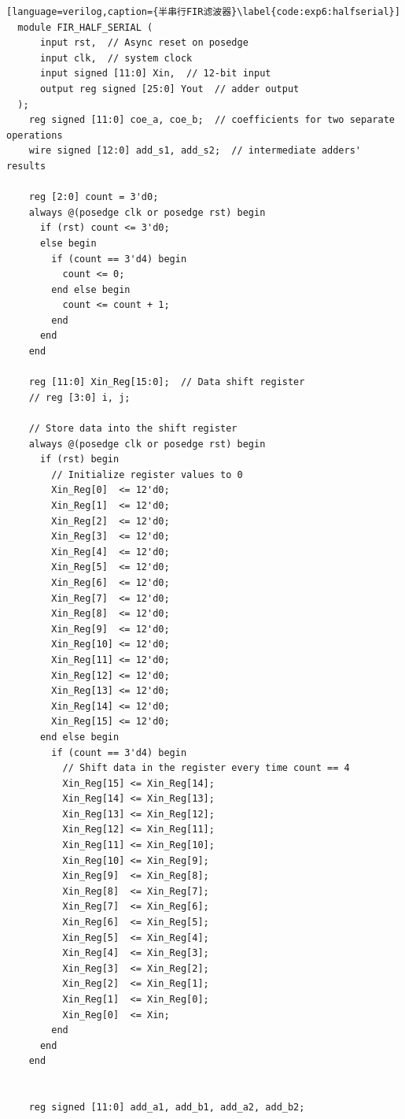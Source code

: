 \begin{lstlisting}[language=verilog,caption={半串行FIR滤波器}\label{code:exp6:halfserial}]
  module FIR_HALF_SERIAL (
      input rst,  // Async reset on posedge            
      input clk,  // system clock                    
      input signed [11:0] Xin,  // 12-bit input
      output reg signed [25:0] Yout  // adder output
  );
    reg signed [11:0] coe_a, coe_b;  // coefficients for two separate operations
    wire signed [12:0] add_s1, add_s2;  // intermediate adders' results
  
    reg [2:0] count = 3'd0;  
    always @(posedge clk or posedge rst) begin
      if (rst) count <= 3'd0;
      else begin
        if (count == 3'd4) begin
          count <= 0;
        end else begin
          count <= count + 1;
        end
      end
    end
  
    reg [11:0] Xin_Reg[15:0];  // Data shift register
    // reg [3:0] i, j; 
  
    // Store data into the shift register
    always @(posedge clk or posedge rst) begin
      if (rst) begin
        // Initialize register values to 0
        Xin_Reg[0]  <= 12'd0;
        Xin_Reg[1]  <= 12'd0;
        Xin_Reg[2]  <= 12'd0;
        Xin_Reg[3]  <= 12'd0;
        Xin_Reg[4]  <= 12'd0;
        Xin_Reg[5]  <= 12'd0;
        Xin_Reg[6]  <= 12'd0;
        Xin_Reg[7]  <= 12'd0;
        Xin_Reg[8]  <= 12'd0;
        Xin_Reg[9]  <= 12'd0;
        Xin_Reg[10] <= 12'd0;
        Xin_Reg[11] <= 12'd0;
        Xin_Reg[12] <= 12'd0;
        Xin_Reg[13] <= 12'd0;
        Xin_Reg[14] <= 12'd0;
        Xin_Reg[15] <= 12'd0;
      end else begin
        if (count == 3'd4) begin
          // Shift data in the register every time count == 4
          Xin_Reg[15] <= Xin_Reg[14];
          Xin_Reg[14] <= Xin_Reg[13];
          Xin_Reg[13] <= Xin_Reg[12];
          Xin_Reg[12] <= Xin_Reg[11];
          Xin_Reg[11] <= Xin_Reg[10];
          Xin_Reg[10] <= Xin_Reg[9];
          Xin_Reg[9]  <= Xin_Reg[8];
          Xin_Reg[8]  <= Xin_Reg[7];
          Xin_Reg[7]  <= Xin_Reg[6];
          Xin_Reg[6]  <= Xin_Reg[5];
          Xin_Reg[5]  <= Xin_Reg[4];
          Xin_Reg[4]  <= Xin_Reg[3];
          Xin_Reg[3]  <= Xin_Reg[2];
          Xin_Reg[2]  <= Xin_Reg[1];
          Xin_Reg[1]  <= Xin_Reg[0];
          Xin_Reg[0]  <= Xin;
        end
      end
    end
  
  
    reg signed [11:0] add_a1, add_b1, add_a2, add_b2;
  

\end{lstlisting}
